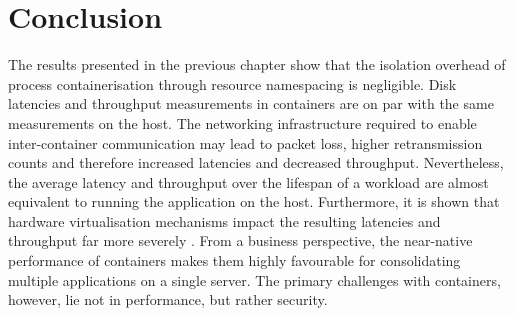 \chapter{Conclusion}
\label{ch:conclusion}
The results presented in the previous chapter show that the isolation overhead 
of process containerisation through resource namespacing is negligible. Disk latencies and throughput measurements 
in containers are on par with the same measurements on the host.
The networking infrastructure required to enable inter-container communication may lead to 
packet loss, higher retransmission counts and therefore increased latencies and decreased throughput.
Nevertheless, the average latency and throughput over the lifespan of a workload are almost
equivalent to running the application on the host. Furthermore, it is shown that 
hardware virtualisation mechanisms impact the resulting latencies and throughput far more 
severely \cite{https://doi.org/10.1002/cpe.5693} \cite{8457798}.
From a business perspective, the near-native performance of containers makes them highly 
favourable for consolidating multiple applications on a single server. The primary 
challenges with containers, however, lie not in performance, but rather security.

